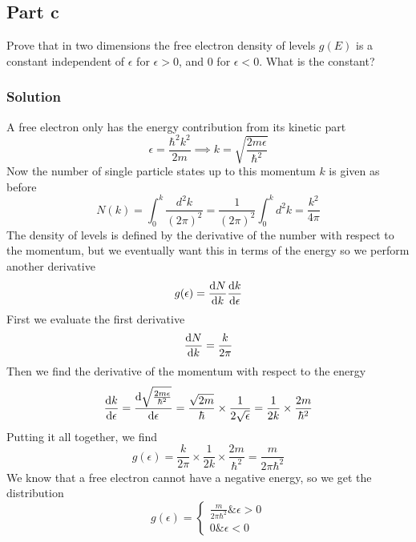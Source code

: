 \documentclass[12pt]{article}
\begin{document}
\subsection{Part c}
Prove that in two dimensions the free electron density of levels \( g(E) \) is a constant independent of \( \epsilon \) for \( \epsilon > 0 \), and 0 for \( \epsilon < 0 \). What is the constant?
\subsubsection{Solution}
A free electron only has the energy contribution from its kinetic part
\begin{equation}
    \epsilon = \frac{\hbar^2 k^2}{2m} \implies k = \sqrt{\frac{2m\epsilon}{\hbar^2}}
\end{equation}
Now the number of single particle states up to this momentum \( k \) is given as before
\begin{equation}
    N(k) = \int_{0}^{k} \frac{d^2k}{(2\pi)^2} = \frac{1}{(2\pi)^2} \int_{0}^{k} d^2k = \frac{k^2}{4\pi}
\end{equation}
The density of levels is defined by the derivative of the number with respect to the momentum, but we eventually want this in terms of the energy so we perform another derivative
\begin{equation}
    g(\epsilon) = \dv{N}{k} \dv{k}{\epsilon}
\end{equation}
First we evaluate the first derivative
\begin{equation}
    \dv{N}{k} = \frac{k}{2\pi}
\end{equation}
Then we find the derivative of the momentum with respect to the energy
\begin{equation}
    \dv{k}{\epsilon} = \dv{\sqrt{\frac{2m\epsilon}{\hbar^2}}}{\epsilon} = \frac{\sqrt{2m}}{\hbar} \times \frac{1}{2\sqrt{\epsilon}} = \frac{1}{2k} \times \frac{2m}{\hbar^2}
\end{equation}
Putting it all together, we find
\begin{equation}
    g(\epsilon) = \frac{k}{2\pi} \times \frac{1}{2k} \times \frac{2m}{\hbar^2} = \frac{m}{2\pi \hbar^2}
\end{equation}
We know that a free electron cannot have a negative energy, so we get the distribution
\begin{equation}
    g(\epsilon) = \begin{cases}
        \frac{m}{2\pi \hbar^2} \& \epsilon > 0 \\
        0 \& \epsilon < 0
    \end{cases}
\end{equation}
\end{document}
